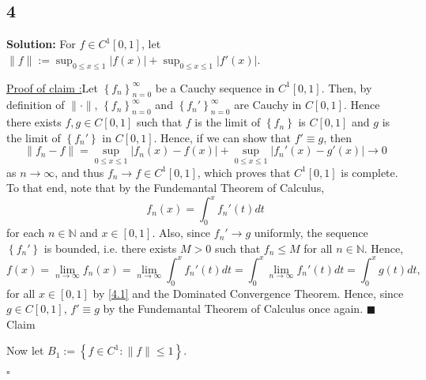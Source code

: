\documentclass[12pt]{article}
\newcounter{ProofCounter}
\newcounter{ClaimCounter}[ProofCounter]
\newenvironment{Solution}{\stepcounter{ProofCounter}\textbf{Solution:}}{\hfill$\square$}
\newenvironment{claim}[1]{\vspace{1mm}\stepcounter{ClaimCounter}\par\noindent\underline{\bf Claim \theClaimCounter:}\space#1}{}
\newenvironment{claimproof}[1]{\par\noindent\underline{Proof of claim \theClaimCounter:}\space#1}{\hfill $\blacksquare$ Claim \theClaimCounter}
\begin{document}
\subsection*{4}
\begin{Solution}
  For $f \in C^{1}[0,1]$, let $\|f\| := \sup_{0\leq x \leq 1}|f(x)| + \sup_{0\leq x\leq 1}|f'(x)|$.

  \begin{claimproof}
    Let $\left\{ f_{n} \right\}_{n=0}^{\infty}$ be a Cauchy sequence in $C^{1}[0,1]$. Then, by definition of $\|\cdot\|$, $\left\{ f_{n}
    \right\}_{n=0}^{\infty}$ and $\left\{ f_{n}' \right\}_{n=0}^{\infty}$ are Cauchy in $C[0,1]$. Hence there exists $f, g \in C[0,1]$ such that $f$
    is the limit of $\left\{ f_n \right\}$ is $C[0,1]$ and $g$ is the limit of $\left\{ f_n' \right\}$ in $C[0,1]$. Hence, if we can show that $f'
    \equiv g$, then 
    \[
      \|f_n - f\| = \sup_{0\leq x\leq 1}|f_n(x) - f(x)| + \sup_{0\leq x \leq 1}|f_n'(x) - g'(x)| \longrightarrow 0
    \]
    as $n\rightarrow \infty$, and thus $f_n \rightarrow f \in C^{1}[0,1]$, which proves that $C^{1}[0,1]$ is complete. To that end, note that by the
    Fundemantal Theorem of Calculus,
    \begin{equation}
      f_{n}(x) = \int_{0}^{x}f_{n}'(t)dt
      \label{4.1}
    \end{equation}
    for each $n \in \mathbb{N}$ and $x \in [0,1]$. Also, since $f_{n}' \rightarrow g$ uniformly, the sequence $\left\{ f_n' \right\}$ is bounded, i.e.
    there exists $M > 0$ such that $f_{n} \leq M$ for all $n \in \mathbb{N}$. Hence,
    \[
      f(x) = \lim_{n\rightarrow\infty} f_{n}(x) = \lim_{n\rightarrow\infty}\int_{0}^{x}f_{n}'(t)dt = \int_{0}^{x} \lim_{n\rightarrow\infty}f_{n}'(t)dt
      = \int_{0}^{x}g(t)dt,
    \]
    for all $x \in [0,1]$ by \eqref{4.1} and the Dominated Convergence Theorem. Hence, since $g \in C[0,1]$, $f' \equiv g$ by the Fundemantal Theorem
    of Calculus once again.
  \end{claimproof}

  Now let $B_1 := \left\{ f \in C^{1} : \|f\| \leq 1 \right\}$.


\end{Solution}
\end{document}
